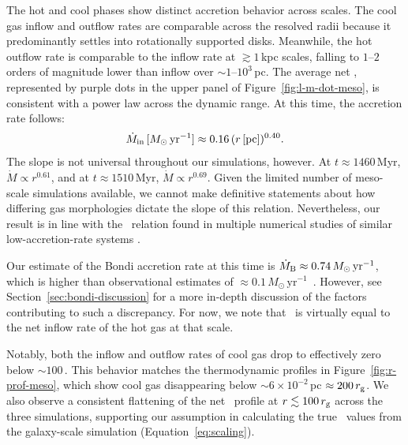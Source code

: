 The hot and cool phases show distinct accretion behavior across scales.
The cool gas inflow and outflow rates are comparable across the resolved radii because it predominantly settles into rotationally supported disks.
Meanwhile, the hot outflow rate is comparable to the inflow rate at $\gtrsim 1$\,kpc scales, falling to $1\text{--}2$ orders of magnitude lower than inflow over $\sim 1$--$10^3$\,pc.
The average net \mdot, represented by purple dots in the upper panel of Figure~\ref{fig:l-m-dot-meso}, is consistent with a power law across the dynamic range.
At this time, the accretion rate follows:
\begin{equation} \label{eq:930_scaling}
    \dot{M}_{\rm in}\,[M_{\odot}\,\mathrm{yr^{-1}}] \approx 0.16\, (r\,\mathrm{[pc]})^{0.40}.
\end{equation}
The slope is not universal throughout our simulations, however.
At $t\approx1460$\,Myr, $\dot{M}\propto r^{0.61}$, and at $t\approx1510$\,Myr, $\dot{M}\propto r^{0.69}$.
Given the limited number of meso-scale simulations available, we cannot make definitive statements about how differing gas morphologies dictate the slope of this relation.
Nevertheless, our result is in line with the \mrrelation\ relation found in multiple numerical studies of similar low-accretion-rate systems \citep[e.g.,][]{ressler_ab_2020,white_structure_2020,lalakos_bridging_2022,guo_toward_2023,guo_magnetized_2024, cho_multizone_2024}.

Our estimate of the Bondi accretion rate at this time is $\dot{M}_{\rm B} \approx 0.74\,M_{\odot}\,\mathrm{yr^{-1}}$, which is higher than observational estimates of $\approx 0.1\,M_{\odot}\,\mathrm{yr^{-1}}$\ \citep{di_matteo_accretion_2003,russell_inside_2015}.
However, see Section~\ref{sec:bondi-discussion} for a more in-depth discussion of the factors contributing to such a discrepancy.
For now, we note that \mdotb\ is virtually equal to the net inflow rate of the hot gas at that scale.

Notably, both the inflow and outflow rates of cool gas drop to effectively zero below $\sim 100$\,\rg.
This behavior matches the thermodynamic profiles in Figure~\ref{fig:r-prof-meso}, which show cool gas disappearing below $\sim 6 \times 10^{-2}$\,pc $\approx 200\, r_{\rm g}$.
We also observe a consistent flattening of the net \mdot\ profile at $r \lesssim 100\,r_{\rm g}$ across the three simulations, supporting our assumption in calculating the true \mdotbh\ values from the galaxy-scale simulation (Equation~\ref{eq:scaling}).

